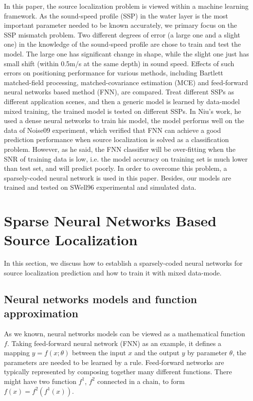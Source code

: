 In this paper, the source localization problem is viewed within a machine learning
framework. As the sound-speed profile (SSP) in the water layer is the most important parameter needed to be known accurately\cite{feuillade1989environmental}, we primary focus on the SSP
mismatch problem.
Two different degrees of error (a large one and a slight one) in the knowledge of the sound-speed profile are chose to train and test the model.
The large one has significant change in shape, while the slight one just has small shift (within 0.5m/s at the same depth) in sound speed.
Effects of such errors on positioning performance for various methods, including Bartlett matched-field processing, matched-covariance estimation (MCE) and feed-forward neural networks based method (FNN), are compared.
Treat different SSPs as different application scenes, and then a generic model is learned by data-model mixed training, the trained model is tested on
different SSPs.
In Niu's work\cite{niu2017source}, he used a dense neural networks to train his model, the model performs well on the data of Noise09 experiment, which verified that FNN can achieve a good prediction performance when source localization is solved as a classification problem. However, as he said, the FNN classifier will be over-fitting when the SNR of training data is low, i.e. the model accuracy on training set is much lower than test set, and will predict poorly. In order to overcome this problem,
a sparsely-coded neural network is used in this paper. Besides, our models are trained and tested on SWell96 experimental and simulated data.

\section{Sparse Neural Networks Based Source Localization}
In this section, we discuss how to establish a sparsely-coded neural networks for
source localization prediction and how to train it with mixed data-mode.

\subsection{Neural networks models and function approximation}
As we known, neural networks models can be viewed as a mathematical function $f$. Taking feed-forward neural network (FNN) as an example, it defines a mapping ${{y}}=f(x;\theta )$ between the input $x$ and the output $y$ by parameter $\theta$, the parameters are needed to be learned by a rule. Feed-forward networks are typically represented by composing together many different functions. There might have two function $f^{1}$, $f^{2}$ connected in a chain\cite{goodfellow2016deep}, to form
$f(x) = f^{2}(f^{1}(x))$.

